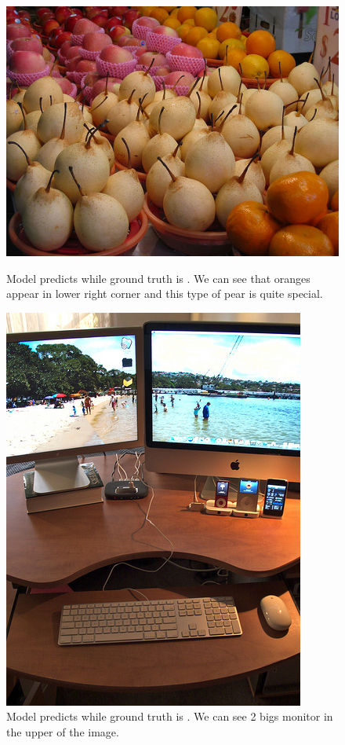 \begin{figure}[!ht]
	\centering
	\begin{minipage}[t]{0.45\linewidth}
		\includegraphics[scale=0.35]{./figures/testFail1}
		\caption{Model predicts  while ground truth is . We can see that oranges appear in lower right corner and this type of pear is quite special.}
		\label{fig:testFail1}
	\end{minipage}
	\quad
	\begin{minipage}[t]{0.45\linewidth}
		\includegraphics[scale=0.45]{./figures/testFail2}
		\caption{Model predicts  while ground truth is . We can see 2 bigs monitor in the upper of the image.}
		\label{fig:testFail2}
	\end{minipage}
\end{figure}